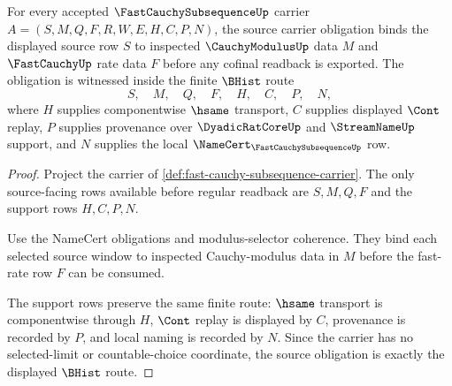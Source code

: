 \begin{theorem}
\label{thm:fast-cauchy-subsequence-source-carrier}
For every accepted $\FastCauchySubsequenceUp$ carrier $A=(S,M,Q,F,R,W,E,H,C,P,N)$, the source carrier obligation binds the displayed source row $S$ to inspected $\CauchyModulusUp$ data $M$ and $\FastCauchyUp$ rate data $F$ before any cofinal readback is exported. The obligation is witnessed inside the finite $\BHist$ route
$$
S,\quad M,\quad Q,\quad F,\quad H,\quad C,\quad P,\quad N,
$$
where $H$ supplies componentwise $\hsame$ transport, $C$ supplies displayed $\Cont$ replay, $P$ supplies provenance over $\DyadicRatCoreUp$ and $\StreamNameUp$ support, and $N$ supplies the local $\NameCert_{\FastCauchySubsequenceUp}$ row.
\end{theorem}
\begin{proof}
Project the carrier of \autoref{def:fast-cauchy-subsequence-carrier}. The only source-facing rows available before regular readback are $S,M,Q,F$ and the support rows $H,C,P,N$.

Use the NameCert obligations and modulus-selector coherence. They bind each selected source window to inspected Cauchy-modulus data in $M$ before the fast-rate row $F$ can be consumed.

The support rows preserve the same finite route: $\hsame$ transport is componentwise through $H$, $\Cont$ replay is displayed by $C$, provenance is recorded by $P$, and local naming is recorded by $N$. Since the carrier has no selected-limit or countable-choice coordinate, the source obligation is exactly the displayed $\BHist$ route.
\end{proof}

